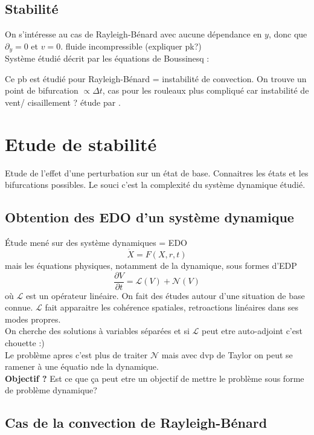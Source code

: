 \subsection{Stabilité}

On s'intéresse au cas de Rayleigh-Bénard avec aucune dépendance en $y$, donc que $\partial_y = 0$ et $v=0$. 
fluide incompressible (expliquer pk?)\\
Système étudié décrit par les équations de Boussinesq : 

Ce pb est étudié pour Rayleigh-Bénard = instabilité de convection. On trouve un point de bifurcation $\propto \Delta t$, cas pour les rouleaux plus compliqué car instabilité de vent/ cisaillement ? étude par \cite{liuAnalyticalModelRoll2009}.

\section{Etude de stabilité} Etude de l'effet d'une perturbation sur un état de base. Connaitres les états et les bifurcations possibles. Le souci c'est la complexité du système dynamique étudié. \\

\subsection{Obtention des EDO d'un système dynamique}
Étude mené sur des système dynamiques = EDO
 \begin{equation}
 	\label{eq:EDOdyn}
 	\dot X = F(X, r, t) 
 \end{equation}
 mais les équations physiques, notamment de la dynamique, sous formes d'EDP 
 \begin{equation}
 	\label{eq:EDPphys}
 	\frac{\partial V}{\partial t} = \mathcal L(V) + \mathcal{N} (V)
\end{equation}
 où $\mathcal L$ est un opérateur linéaire. On fait des études autour d'une situation de base connue. $\mathcal{L}$ fait apparaitre les cohérence spatiales, retroactions linéaires dans ses modes propres. \\
 On cherche des solutions à variables séparées et si $\mathcal{L}$ peut etre auto-adjoint c'est chouette :) \\
 Le problème apres c'est plus de traiter $\mathcal{N}$ mais avec dvp de Taylor on peut se ramener à une équatio nde la dynamique. \\
 \textbf{Objectif ? } Est ce que ça peut etre un objectif de mettre le problème sous forme de problème dynamique? \\

\subsection{Cas de la convection de Rayleigh-Bénard}

